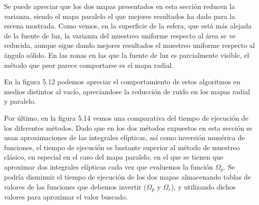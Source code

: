 Se puede apreciar que los dos mapas presentados en esta sección reducen la varianza, siendo el mapa paralelo el que mejores resultados ha dado para la escena mostrada. Como vemos, en la superficie de la esfera, que está más alejada de la fuente de luz, la varianza del muestreo uniforme respecto al área se ve reducida, aunque sigue dando mejores resultados el muestreo uniforme respecto al ángulo sólido. En las zonas en las que la fuente de luz es parcialmente visible, el método que peor parece comportarse es el mapa radial.

En la figura 5.12 podemos apreciar el comportamiento de estos algoritmos en medios distintos al vacío, apreciandose la reducción de ruido en los mapas radial y paralelo.

Por último, en la figura 5.14 vemos una comparativa del tiempo de ejecución de los diferentes métodos. Dado que en los dos métodos expuestos en esta sección se usan aproximaciones de las integrales elípticas, así como inversión numérica de funciones, el tiempo de ejecución es bastante superior al método de muestreo clásico, en especial en el caso del mapa paralelo, en el que se tienen que aproximar dos integrales elípticas cada vez que evaluemos la función $\Omega_p$. Se podría disminuir el tiempo de ejecución de los dos mapas almacenando tablas de valores de las funciones que debemos invertir ($\Omega_p$ y $\Omega_r$), y utilizando dichos valores para aproximar el valor buscado.


